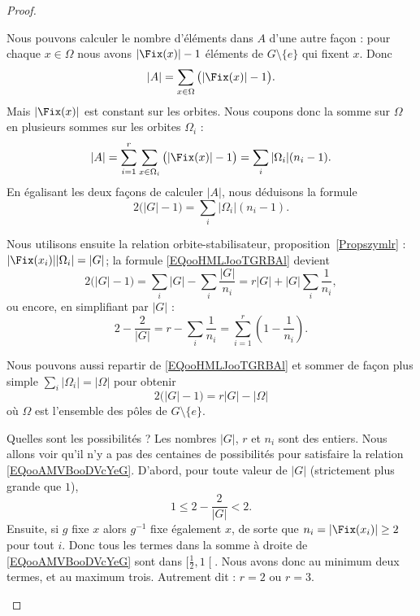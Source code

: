\begin{proof}
\begin{subproof}
		Nous pouvons calculer le nombre d'éléments dans \( A \) d'une autre façon : pour chaque \( x\in \Omega\) nous avons \( | \Fix(x) |-1\) éléments de \( G\setminus\{ e \}\) qui fixent \( x\). Donc
		\begin{equation}
			| A |=\sum_{x\in\Omega}\big( | \Fix(x) |-1 \big).
		\end{equation}
		Mais \( | \Fix(x) |\) est constant sur les orbites. Nous coupons donc la somme sur \( \Omega\) en plusieurs sommes sur les orbites \( \Omega_i\) :
		\begin{equation}
			| A |=\sum_{i=1}^r\sum_{x\in \Omega_i}\big( | \Fix(x) |-1 \big)=\sum_i| \Omega_i |(n_i-1).
		\end{equation}
		En égalisant les deux façons de calculer \( | A |\), nous déduisons la formule
		\begin{equation}        \label{EQooHMLJooTGRBAl}
			2\big( | G |-1 \big)=\sum_i| \Omega_i |(n_i-1).
		\end{equation}

		Nous utilisons ensuite la relation orbite-stabilisateur, proposition~\ref{Propszymlr} : \( | \Fix(x_i) | |\Omega_i |=| G |\); la formule \eqref{EQooHMLJooTGRBAl} devient
		\begin{equation}
			2\big( | G |-1 \big)=\sum_i| G |-\sum_i\frac{ | G | }{ n_i }=r| G |+| G |\sum_i\frac{1}{ n_i },
		\end{equation}
		ou encore, en simplifiant par \( | G |\) :
		\begin{equation}        \label{EQooAMVBooDVcYeG}
			2-\frac{ 2 }{ | G | }=r-\sum_i\frac{1}{ n_i }=\sum_{i=1}^r\left( 1-\frac{1}{ n_i } \right).
		\end{equation}

		Nous pouvons aussi repartir de \eqref{EQooHMLJooTGRBAl} et sommer de façon plus simple \( \sum_i| \Omega_i |=| \Omega |\) pour obtenir
		\begin{equation}        \label{EQooTHUIooUEXsNl}
			2\big( | G |-1 \big)=r| G |-| \Omega |
		\end{equation}
		où \( \Omega\) est l'ensemble des pôles de \( G\setminus\{ e \}\).

		\item[Quelles sont les possibilités ?]
		Les nombres \( | G |\), \( r\) et \( n_i\) sont des entiers. Nous allons voir qu'il n'y a pas des centaines de possibilités pour satisfaire la relation \eqref{EQooAMVBooDVcYeG}. D'abord, pour toute valeur de \( | G |\) (strictement plus grande que \( 1\)),
		\begin{equation}
			1\leq 2-\frac{ 2 }{ | G | }<2.
		\end{equation}
		Ensuite, si \( g\) fixe \( x\) alors \( g^{-1}\) fixe également \( x\), de sorte que \( n_i=| \Fix(x_i) |\geq 2\) pour tout \( i\). Donc tous les termes dans la somme à droite de \eqref{EQooAMVBooDVcYeG} sont dans \( \mathopen[ \frac{ 1 }{2} , 1 \mathclose[\). Nous avons donc au minimum deux termes, et au maximum trois. Autrement dit : \( r=2\) ou \( r=3\).


\end{subproof}
\end{proof}
